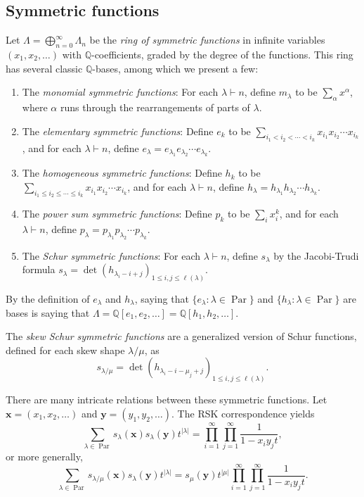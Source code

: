 \documentclass[pdflatex,sn-mathphys-num]{sn-jnl}%
\theoremstyle{thmstyleone}%
\theoremstyle{thmstyletwo}%
\theoremstyle{thmstylethree}%
\numberwithin{equation}{section}
\newcommand{\Q}{\mathbb{Q}}
\DeclareMathOperator{\Par}{Par}
\begin{document}
    \subsection{Symmetric functions}
	Let $\Lambda=\bigoplus_{n=0}^\infty \Lambda_n$ be the \emph{ring of symmetric functions} in infinite variables $(x_1,x_2,\dotsc)$ with $\Q$-coefficients, graded by the degree of the functions. This ring has several classic $\Q$-bases, among which we present a few:
	\begin{enumerate}[(1)]
		\item The \emph{monomial symmetric functions}: For each $\lambda\vdash n$, define $m_\lambda$ to be $\sum_{\alpha} x^\alpha$, where $\alpha$ runs through the rearrangements of parts of $\lambda$. 
		\item The \emph{elementary symmetric functions}: Define $e_k$ to be $\sum_{i_1<i_2<\cdots<i_k} x_{i_1}x_{i_2}\cdots x_{i_k}$, and for each $\lambda\vdash n$, define $e_\lambda= e_{\lambda_1}e_{\lambda_2}\cdots e_{\lambda_k}$.
		\item The \emph{homogeneous symmetric functions}: Define $h_k$ to be \\$\sum_{i_1\leq i_2\leq \cdots\leq i_k} x_{i_1}x_{i_2}\cdots x_{i_k}$, and for each $\lambda\vdash n$, define $h_\lambda= h_{\lambda_1}h_{\lambda_2}\cdots h_{\lambda_k}$.
            \item The \emph{power sum symmetric functions}: Define $p_k$ to be $\sum_{i}x_i^k$, and for each $\lambda\vdash n$, define $p_\lambda= p_{\lambda_1}p_{\lambda_2}\cdots p_{\lambda_k}$.
		\item The \emph{Schur symmetric functions}: For each $\lambda\vdash n$, define $s_\lambda$ by the Jacobi-Trudi formula $s_{\lambda}= \det\left(h_{\lambda_i-i+j}\right)_{1\leq i,j\leq \ell(\lambda)}$.
	\end{enumerate}
	By the definition of $e_{\lambda}$ and $h_{\lambda}$, saying that $\{e_\lambda:\lambda \in \Par\}$ and $\{h_\lambda:\lambda\in \Par\}$ are bases is saying that $\Lambda=\Q[e_1,e_2,\dotsc] = \Q[h_1,h_2,\dotsc]$.

	The \emph{skew Schur symmetric functions} are a generalized version of Schur functions, defined for each skew shape $\lambda/\mu$, as 
	\[s_{\lambda/\mu}= \det\left(h_{\lambda_i-i-\mu_j+j}\right)_{1\leq i,j\leq \ell(\lambda)}.\]
	
	There are many intricate relations between these symmetric functions. 
    Let $\mathbf{x}=(x_1,x_2,\dotsc)$ and $\mathbf{y}=(y_1,y_2,\dotsc)$. The RSK correspondence yields
	\[\sum_{\lambda\in \Par}s_\lambda(\mathbf{x})s_\lambda(\mathbf{y})t^{|\lambda|} = \prod_{i=1}^{\infty}\prod_{j=1}^\infty \frac{1}{1-x_iy_jt},\]
	or more generally, \cite[fourth equation on page 70]{macdonald1998symmetric}
	\[\sum_{\lambda\in \Par}s_{\lambda/\mu}(\mathbf{x})s_\lambda(\mathbf{y})t^{|\lambda|} = s_{\mu}(\mathbf{y})t^{|\mu|} \prod_{i=1}^{\infty}\prod_{j=1}^\infty \frac{1}{1-x_iy_jt}.\]
	
\end{document}
